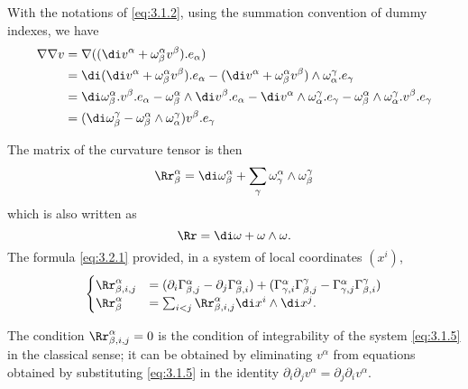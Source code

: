 \begin{para}
  With the notations of \cref{eq:3.1.2},
  using the summation convention of dummy indexes,
  we have
  \begin{align*}
    \nabla\nabla v &=
    \nabla((\di v^\alpha + \omega^\alpha_\beta v^\beta).e_\alpha) \\&=
    \di(\di v^\alpha + \omega^\alpha_\beta v^\beta).e_\alpha -
    (\di v^\alpha + \omega^\alpha_\beta v^\beta)
    \wedge\omega^\gamma_\alpha.e_\gamma \\&=
    \di\omega^\alpha_\beta.v^\beta.e_\alpha -
    \omega^\alpha_\beta\wedge\di v^\beta.e_\alpha -
    \di v^\alpha\wedge\omega^\gamma_\alpha.e_\gamma -
    \omega^\alpha_\beta\wedge\omega^\gamma_\alpha.v^\beta.e_\gamma \\&=
    (\di\omega^\gamma_\beta-\omega^\alpha_\beta\wedge\omega^\gamma_\alpha)
    v^\beta.e_\gamma
  \end{align*}

  The matrix of the curvature tensor is then
  \begin{equation}\label{eq:3.2.1}
    \Rr^\alpha_\beta =
    \di\omega^\alpha_\beta +
    \sum_\gamma\omega^\alpha_\gamma\wedge\omega^\gamma_\beta
  \end{equation}
  which is also written as
  \begin{equation}
    \Rr = \di\omega + \omega\wedge\omega.
  \end{equation}
  The formula \cref{eq:3.2.1} provided,
  in a system of local coordinates $(x^i)$,
  \begin{equation}
    \begin{cases}
      \Rr^\alpha_{\beta,i,j} &=
      (\partial_i\Gamma^\alpha_{\beta,j}-\partial_j\Gamma^\alpha_{\beta,i}) +
      (\Gamma^\alpha_{\gamma,i}\Gamma^\gamma_{\beta,j}-
      \Gamma^\alpha_{\gamma,j}\Gamma^\gamma_{\beta,i}) \\
      \Rr^\alpha_\beta &= \sum_{i<j}\Rr^\alpha_{\beta,i,j}\di x^i\wedge\di x^j.
    \end{cases}
  \end{equation}

  The condition $\Rr^{\alpha}_{\beta,i,j}=0$ is the condition of integrability
  of the system \cref{eq:3.1.5} in the classical sense;
  it can be obtained by eliminating $v^\alpha$ from equations obtained by
  substituting \cref{eq:3.1.5} in the identity
  $\partial_i\partial_j v^\alpha = \partial_j\partial_i v^\alpha$.
\end{para}











